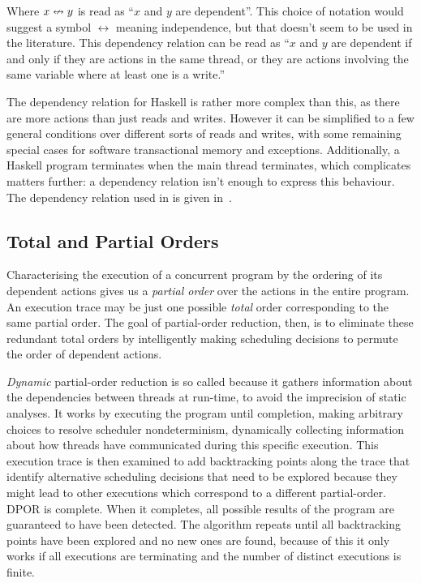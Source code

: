 Where $x \nleftrightarrow y$ is read as ``$x$ and $y$ are dependent''.  This choice of
notation would suggest a symbol $\leftrightarrow$ meaning independence, but that
doesn't seem to be used in the literature.  This dependency relation can be read
as ``$x$ and $y$ are dependent if and only if they are actions in the same
thread, or they are actions involving the same variable where at least one is a
write.''

The dependency relation for Haskell is rather more complex than this, as there
are more actions than just reads and writes.  However it can be simplified to a
few general conditions over different sorts of reads and writes, with some
remaining special cases for software transactional memory and exceptions.
Additionally, a Haskell program terminates when the main thread terminates,
which complicates matters further: a dependency relation isn't enough to express
this behaviour.  The dependency relation used in \dejafu{} is given
in~.

\subsection{Total and Partial Orders}

Characterising the execution of a concurrent program by the ordering of its
dependent actions gives us a \emph{partial order} over the actions in the entire
program.  An execution trace may be just one possible \emph{total} order
corresponding to the same partial order.  The goal of partial-order reduction,
then, is to eliminate these redundant total orders by intelligently making
scheduling decisions to permute the order of dependent actions.

\emph{Dynamic} partial-order reduction is so called because it gathers
information about the dependencies between threads at run-time, to avoid the
imprecision of static analyses\cite{flanagan2005}.  It works by executing the
program until completion, making arbitrary choices to resolve scheduler
nondeterminism, dynamically collecting information about how threads have
communicated during this specific execution.  This execution trace is then
examined to add backtracking points along the trace that identify alternative
scheduling decisions that need to be explored because they might lead to other
executions which correspond to a different partial-order.  DPOR is complete.
When it completes, all possible results of the program are guaranteed to have
been detected.  The algorithm repeats until all backtracking points have been
explored and no new ones are found, because of this it only works if all
executions are terminating and the number of distinct executions is finite.

